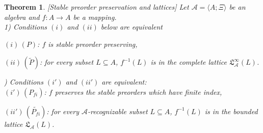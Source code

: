 \documentclass[11pt,a4paper]{article}
\newtheorem{theorem}{Theorem}[section]
\theoremstyle{definition} %
\newcommand\+[1]{\mathcal{#1}} %
\newcommand{\Latt}{{\mathfrak{L}}}
\newcommand{\gen}{\textit{gen}}
\begin{document}
\begin{theorem} \label{th:LatticeGen} 
[Stable preorder preservation and lattices]
Let $\+A=\langle A;\Xi\rangle$ be  an algebra  and $f\colon A\to A$ be a mapping. %
\\
1) Conditions $(i)$ and $(ii)$ below are equivalent

$ (i)\,(P)$: $f$ is stable preorder preserving,

 $(ii)\,(\widetilde{P})$: %
for every  subset  $L\subseteq A$, $f^{-1}(L)$ is in the complete lattice $\Latt_{\+A}^\infty(L)$.

) Conditions $(i')$ and $(ii')$ are equivalent:
\\%
\indent
$(i')\,(P_{\textit{fi}})$:  $f$ preserves the stable preorders which have finite index,

$(ii')\,(\widetilde{P_{\textit{fi}}})$:
for every $\+A$-recognizable subset $L\subseteq A$, $f^{-1}(L)$ is in
the bounded lattice $\Latt_{\+A}(L)$.
\end{theorem}
%
\end{document}
